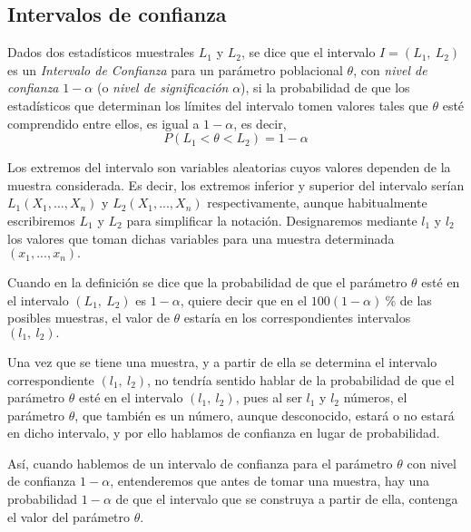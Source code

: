 \subsection{Intervalos de confianza}
Dados dos estadísticos muestrales $L_1$ y $L_2$, se dice que el intervalo $I=(L_1,\ L_2)$ es un \emph{Intervalo de
Confianza} para un parámetro poblacional $\theta$, con \emph{nivel de confianza} $1-\alpha$ (o \emph{nivel de
significación} $\alpha $), si la probabilidad de que los estadísticos que determinan los límites del intervalo tomen
valores tales que $\theta$ esté comprendido entre ellos, es igual a $1-\alpha$, es decir, \[ P\left( L_{1}<\theta
<L_{2}\right) =1-\alpha \]

Los extremos del intervalo son variables aleatorias cuyos valores dependen de la muestra considerada. Es decir, los
extremos inferior y superior del intervalo serían $L_{1}\left( X_{1},...,X_{n}\right) $ y $L_{2}\left(
X_{1},...,X_{n}\right) $ respectivamente, aunque habitualmente escribiremos $L_{1}$ y $L_{2}$ para simplificar la
notación. Designaremos mediante $l_{1}$ y $l_{2}$ los valores que toman dichas variables para una muestra determinada
$\left( x_{1},...,x_{n}\right).$

Cuando en la definición se dice que la probabilidad de que el parámetro $\theta $ esté en el intervalo $\left( L_{1},\
L_{2}\right) $ es $1-\alpha $, quiere decir que en el $100 \left( 1-\alpha \right) \ \% $ de las posibles muestras, el
valor de $\theta $ estaría en los correspondientes intervalos $\left( l_{1},\ l_{2}\right) .$

Una vez que se tiene una muestra, y a partir de ella se determina el intervalo correspondiente $\left( l_{1},\
l_{2}\right) $, no tendría sentido hablar de la probabilidad de que el parámetro $\theta $ esté en el intervalo $\left(
l_{1},\ l_{2}\right) $, pues al ser $l_{1}$ y $l_{2}$ números, el parámetro $\theta $, que también es un número, aunque
desconocido, estará o no estará en dicho intervalo, y por ello hablamos de confianza en lugar de probabilidad.

Así, cuando hablemos de un intervalo de confianza para el parámetro $\theta $ con nivel de confianza $1-\alpha $,
entenderemos que antes de tomar una muestra, hay una probabilidad $1-\alpha $ de que el intervalo que se construya a
partir de ella, contenga el valor del parámetro $\theta .$

